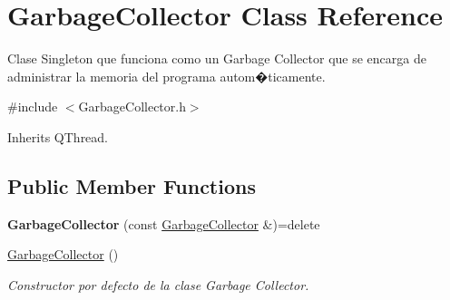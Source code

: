 \hypertarget{class_garbage_collector}{}\section{Garbage\+Collector Class Reference}
\label{class_garbage_collector}


Clase Singleton que funciona como un Garbage Collector que se encarga de administrar la memoria del programa autom�ticamente.  




{\ttfamily \#include $<$Garbage\+Collector.\+h$>$}



Inherits Q\+Thread.

\subsection*{Public Member Functions}
\begin{DoxyCompactItemize}
\item 
\mbox{\label{class_garbage_collector_a89dc88b4cba74aad422464a07f34ccab}} 
{\bfseries Garbage\+Collector} (const \hyperlink{class_garbage_collector}{Garbage\+Collector} \&)=delete
\item 
\hyperlink{class_garbage_collector_a78b0b35e1b0f76dc688f73cb2b7db86f}{Garbage\+Collector} ()
\begin{DoxyCompactList}\small\item\em Constructor por defecto de la clase Garbage Collector. \end{DoxyCompactList}\end{DoxyCompactItemize}
